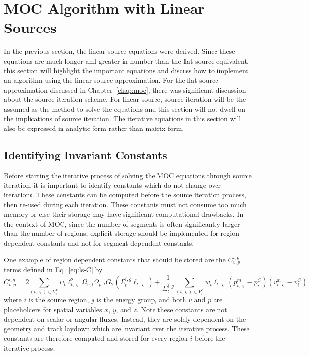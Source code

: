 \section{MOC Algorithm with Linear Sources}
\label{sec:ls-algorithm}

In the previous section, the linear source equations were derived. Since these equations are much longer and greater in number than the flat source equivalent, this section will highlight the important equations and discuss how to implement an algorithm using the linear source approximation. For the flat source approximation discussed in Chapter~\ref{chap:moc}, there was significant discussion about the source iteration scheme. For linear source, source iteration will be the assumed as the method to solve the equations and this section will not dwell on the implications of source iteration. The iterative equations in this section will also be expressed in analytic form rather than matrix form.

\subsection{Identifying Invariant Constants}

Before starting the iterative process of solving the \ac{MOC} equations through source iteration, it is important to identify constants which do not change over iterations. These constants can be computed before the source iteration process, then re-used during each iteration. These constants must not consume too much memory or else their storage may have significant computational drawbacks. In the context of \ac{MOC}, since the number of segments is often significantly larger than the number of regions, explicit storage should be implemented for region-dependent constants and not for segment-dependent constants.

One example of region dependent constants that should be stored are the $C_{v,p}^{i,g}$ terms defined in Eq.~\ref{eq:ls-C} by
\begin{equation*}
	C_{v,p}^{i,g} =  2 \sum_{(t,\varsigma) \in V^F_i} w_t \ell_{t,\varsigma}^2 \Omega_{v,t} \Omega_{p,t} G_2(\Sigma_{t}^{i,g} \ell_{t,\varsigma}) + \frac{1}{\Sigma_{t}^{i,g}} \sum_{(t,\varsigma) \in V^F_i} w_t \ell_{t,\varsigma} \left( p^m_{t,\varsigma} - p^C_i \right) \left(v^m_{t,\varsigma} - v^C_i\right)
\end{equation*}
where $i$ is the source region, $g$ is the energy group, and both $v$ and $p$ are placeholders for spatial variables $x$, $y$, and $z$. Note these constants are not dependent on scalar or angular fluxes. Instead, they are solely dependent on the geometry and track laydown which are invariant over the iterative process. These constants are therefore computed and stored for every region $i$ before the iterative process.

